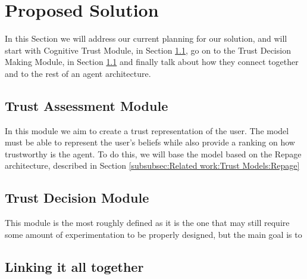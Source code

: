 \section{Proposed Solution}
\label{sec:Solution}
In this Section we will address our current planning for our solution, and will start with Cognitive Trust Module, in Section \ref{subsec:Solution:Trust Assessment Module}, go on to the Trust Decision Making Module, in Section \ref{subsec:Solution:Trust Assessment Module} and finally talk about how they connect together and to the rest of an agent architecture.


\subsection{Trust Assessment Module}
\label{subsec:Solution:Trust Assessment Module}
In this module we aim to create a trust representation of the user. The model must be able to represent the user's beliefs while also provide a ranking on how trustworthy is the agent. To do this, we will base the model based on the Repage architecture, described in Section \ref{subsubsec:Related work:Trust Models:Repage}



\subsection{Trust Decision Module}
\label{subsec:Solution:Trust Decision Making Module}
This module is the most roughly defined as it is the one that may still require some amount of experimentation to be properly designed, but the main goal is to 


\subsection{Linking it all together}
\label{subsec:Solution:Linking all together}